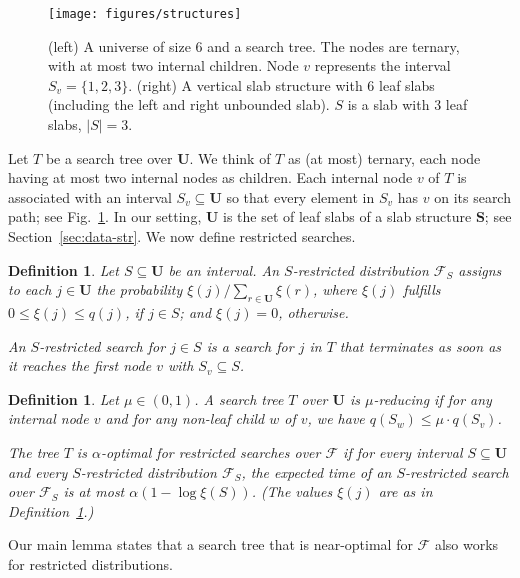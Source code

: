 \documentclass[letterpaper,11pt]{article}
\newtheorem{definition}[theorem]{Definition}
\newcommand{\bS}{\textbf{S}}
\newcommand{\bU}{\textbf{U}}
\newcommand{\cF}{\mathcal{F}}
\begin{document}
\begin{figure}
  \centering
  \texttt{[image: figures/structures]}
  \caption{(left) A universe of size $6$ and a 
  search tree. The nodes are ternary, 
  with at most two internal children.
  Node $v$ represents the interval 
  $S_v = \{1,2,3\}$.
  (right) A vertical slab structure with 
  $6$ leaf slabs (including the left and
  right unbounded slab). 
  $S$ is a  slab with
  $3$ leaf slabs, $|S| = 3$.  }
 \label{fig:structures}
\end{figure}

Let $T$ be a search tree over $\bU$. We think 
of $T$ as (at most) ternary, each node having at 
most two internal nodes as children.
Each internal node $v$ of $T$ is associated
with an interval $S_v \subseteq \bU$ so that
every element in $S_v$ has $v$ on its 
search path; see Fig.~\ref{fig:structures}. 
In our setting, $\bU$ is 
the set of leaf slabs of a slab structure 
$\bS$; see Section~\ref{sec:data-str}.
We now define restricted searches.

\begin{definition}\label{def:rest}
  Let $S \subseteq \bU$  be an interval.
  An \emph{$S$-restricted distribution} 
  $\cF_S$ assigns to each $j \in \bU$
  the probability $\xi(j)/\sum_{r \in \bU} \xi(r)$, 
  where $\xi(j)$  fulfills $0 \leq \xi(j) \leq q(j)$, 
  if $j \in S$; and $\xi(j) = 0$, otherwise.  

  An \emph{$S$-restricted search} for $j \in S$ 
  is a search for $j$ in $T$ that terminates 
  as soon as it reaches the first node $v$ with 
  $S_v \subseteq S$.
\end{definition}

\begin{definition}\label{def:tree}
  Let $\mu \in (0,1)$.  A search tree 
  $T$ over $\bU$ is \emph{$\mu$-reducing} 
  if for any internal node $v$ and 
  for any non-leaf child $w$ of $v$, we 
  have $q(S_w) \leq \mu \cdot q(S_v)$. 

  The tree $T$ is \emph{$\alpha$-optimal 
  for restricted searches over $\cF$} if 
  for every interval $S \subseteq \bU$ 
  and every $S$-restricted distribution 
  $\cF_S$, the expected time of an $S$-restricted 
  search over $\cF_S$ is at most $\alpha(1-\log \xi(S))$. 
  (The values $\xi(j)$ are as in Definition~\ref{def:rest}.)
\end{definition}

Our main lemma states that a
search tree that is near-optimal for 
$\cF$ also works for
restricted distributions. 
\end{document}

